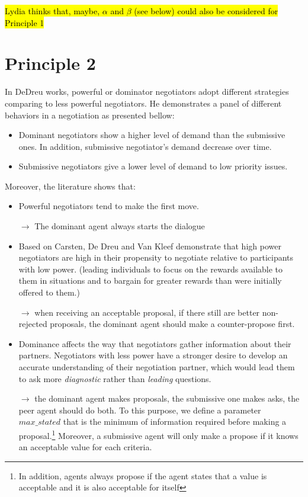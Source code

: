 \documentclass{llncs}
\begin{document}
\hl{Lydia thinks that, maybe, $\alpha$ and $\beta$ (see below) could also be considered for Principle 1}


\section{Principle 2}

In DeDreu works, powerful or dominator negotiators adopt different strategies comparing to less powerful negotiators. He demonstrates a panel of different behaviors in a negotiation as presented bellow:
\begin{itemize}
	\item Dominant negotiators show a higher level of demand than the submissive ones. In addition, submissive negotiator's demand decrease over time. 
	\item Submissive negotiators give a lower level of demand to low priority issues.
\end{itemize} 

Moreover, the literature shows that:
\begin{itemize}
	\item Powerful negotiators tend to make the first move. \cite{magee2007power}
	
	$\rightarrow$ The dominant agent always starts the dialogue
	
	\item Based on Carsten, De Dreu and Van Kleef demonstrate that high power negotiators are high in their propensity to negotiate relative to participants with low power. (leading individuals to focus on the rewards available to them in situations and to bargain for	greater rewards than were initially offered to them.)
	
	$\rightarrow$ when receiving an acceptable proposal, if there still are better non-rejected proposals, the dominant agent should make a counter-propose first.
	
	\item Dominance affects the way that negotiators gather information about their partners. Negotiators with less power have a stronger desire to develop an accurate understanding of their negotiation partner, which would lead them to ask more \emph{diagnostic} rather than \emph{leading} questions.
	
	$\rightarrow$ the dominant agent makes proposals, the submissive one makes asks, the peer agent should do both. To this purpose, we define a parameter $max\_stated$ that is the minimum of information required before making a proposal.\footnote{In addition, agents always propose if the agent states that a value is acceptable and it is also acceptable for itself} Moreover, a submissive agent will only make a propose if it knows an acceptable value for each criteria.
\end{itemize} 
\end{document}
